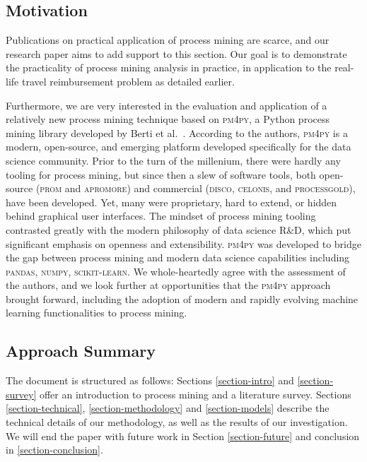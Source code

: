 \documentclass[conference]{IEEEtran}
\begin{document}
\subsection{Motivation}

Publications on practical application of process mining are scarce,
and our research paper aims to add support to this section. Our goal is
to demonstrate the practicality of process mining analysis
in practice, in application to the real-life travel reimbursement problem
as detailed earlier.

Furthermore, we are very interested in the evaluation and application
of a relatively new process mining technique based on
\textsc{pm4py}, a Python process mining library
developed by Berti et al.~\cite{BeZe2019}.
According to the authors,
\textsc{pm4py} is a modern, open-source, and emerging platform developed
specifically for the data science community. Prior to the turn of the
millenium,
there were hardly any tooling for process mining, but
since then a slew of software tools, both open-source
(\textsc{prom} and \textsc{apromore}) and commercial
(\textsc{disco}, \textsc{celonis}, and \textsc{processgold}),
have been developed. Yet, many were proprietary, hard to extend,
or hidden behind graphical user interfaces.
The mindset of process mining
tooling contrasted greatly with the modern philosophy of data science R\&D,
which put significant emphasis on openness and extensibility.
\textsc{pm4py} was developed to bridge the gap
between process mining and modern data science
capabilities including
\textsc{pandas}, \textsc{numpy}, \textsc{scikit-learn}.
We whole-heartedly
agree with the assessment of the authors, and we look further at opportunities
that the \textsc{pm4py} approach brought forward, including
the adoption of modern and rapidly evolving machine learning
functionalities to process mining.


\subsection{Approach Summary}

The document is structured as follows: Sections \ref{section-intro} and
\ref{section-survey}
offer an introduction to process mining and a literature survey.
Sections \ref{section-technical}, \ref{section-methodology} and
\ref{section-models} describe the technical details of our methodology, as
well as the results of our investigation. We will end the paper with
future work in Section \ref{section-future} and conclusion in
\ref{section-conclusion}.
\end{document}
